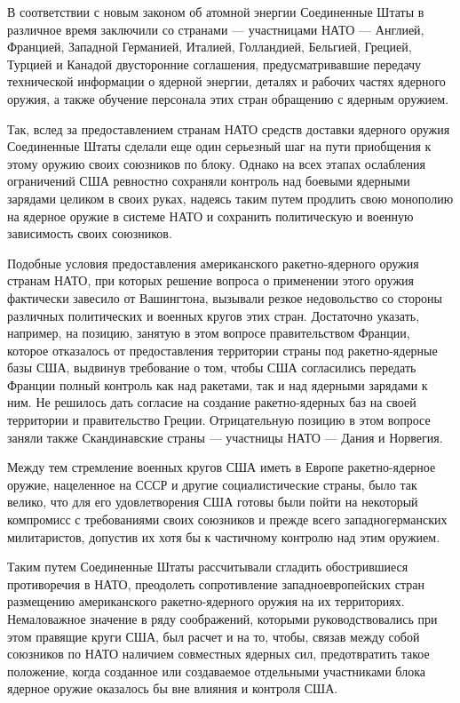 \documentclass[12pt, a4paper, openany]{book}
\begin{document}
	В соответствии с новым законом об атомной энергии Соединенные Штаты в различное время заключили со странами — участницами НАТО — Англией, Францией, Западной Германией, Италией, Голландией, Бельгией, Грецией, Турцией и Канадой двусторонние соглашения, предусматривавшие передачу технической информации о ядерной энергии, деталях и рабочих частях ядерного оружия, а также обучение персонала этих стран обращению с ядерным оружием.
	
	Так, вслед за предоставлением странам НАТО средств доставки ядерного оружия Соединенные Штаты сделали еще один серьезный шаг на пути приобщения к этому оружию своих союзников по блоку. Однако на всех этапах ослабления ограничений США ревностно сохраняли контроль над боевыми ядерными зарядами целиком в своих руках, надеясь таким путем продлить свою монополию на ядерное оружие в системе НАТО и сохранить политическую и военную зависимость своих союзников.
	
	Подобные условия предоставления американского ракетно-ядерного оружия странам НАТО, при которых решение вопроса о применении этого оружия фактически завесило от Вашингтона, вызывали резкое недовольство со стороны различных политических и военных кругов этих стран. Достаточно указать, например, на позицию, занятую в этом вопросе правительством Франции, которое отказалось от предоставления территории страны под ракетно-ядерные базы США, выдвинув требование о том, чтобы США согласились передать Франции полный контроль как над ракетами, так и над ядерными зарядами к ним. Не решилось дать согласие на создание ракетно-ядерных баз на своей территории и правительство Греции. Отрицательную позицию в этом вопросе заняли также Скандинавские страны — участницы НАТО — Дания и Норвегия.
	
	Между тем стремление военных кругов США иметь в Европе ракетно-ядерное оружие, нацеленное на СССР и другие социалистические страны, было так велико, что для его удовлетворения США готовы были пойти на некоторый компромисс с требованиями своих союзников и прежде всего западногерманских милитаристов, допустив их хотя бы к частичному контролю над этим оружием.
	
	Таким путем Соединенные Штаты рассчитывали сгладить обострившиеся противоречия в НАТО, преодолеть сопротивление западноевропейских стран размещению американского ракетно-ядерного оружия на их территориях. Немаловажное значение в ряду соображений, которыми руководствовались при этом правящие круги США, был расчет и на то, чтобы, связав между собой союзников по НАТО наличием совместных ядерных сил, предотвратить такое положение, когда созданное или создаваемое отдельными участниками блока ядерное оружие оказалось бы вне влияния и контроля США.
	
\end{document}
